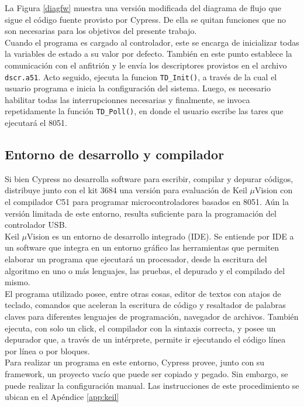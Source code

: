 	La Figura \ref{diagfw} muestra una versión modificada del diagrama de flujo que sigue el código fuente provisto por Cypress. De ella se quitan funciones que no son necesarias para los objetivos del presente trabajo.\\
	
	Cuando el programa es cargado al controlador, este se encarga de inicializar todas la variables de estado a su valor por defecto. También en este punto establece la comunicación con el anfitrión y le envía los descriptores provistos en el archivo \verb|dscr.a51|. Acto seguido, ejecuta la funcion \verb|TD_Init()|, a través de la cual el usuario programa e inicia la configuración del sistema. Luego, es necesario habilitar todas las interrupcionnes necesarias y finalmente, se invoca repetidamente la función \verb|TD_Poll()|, en donde el usuario escribe las tares que ejecutará el 8051.\\
	
	\subsection{Entorno de desarrollo y compilador}
	Si bien Cypress no desarrolla software para escribir, compilar y depurar códigos, distribuye junto con el kit 3684 una versión para evaluación de Keil $\mu$Vision con el compilador C51 para programar microcontroladores basados en 8051. Aún la versión limitada de este entorno, resulta suficiente para la programación del controlador USB.\\
	
	Keil $\mu$Vision es un entorno de desarrollo integrado (IDE). Se entiende por IDE a un software que integra en un entorno gráfico las herramientas que permiten elaborar un programa que ejecutará un procesador, desde la escritura del algoritmo en uno o más lenguajes, las pruebas, el depurado y el compilado del mismo.\\
	
	El programa utilizado posee, entre otras cosas, editor de textos con atajos de teclado, comandos que aceleran la escritura de código y resaltador de palabras claves para diferentes lenguajes de programación, navegador de archivos. También ejecuta, con solo un click, el compilador con la sintaxis correcta, y posee un depurador que, a través de un intérprete, permite ir ejecutando el código línea por línea o por bloques.\\
	
	Para realizar un programa en este entorno, Cypress provee, junto con su framework, un proyecto vacío que puede ser copiado y pegado. Sin embargo, se puede realizar la configuración manual. Las instrucciones de este procedimiento se ubican en el Apéndice \ref{app:keil}
	
